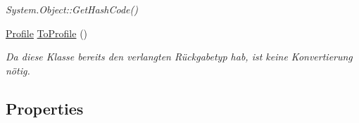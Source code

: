 \begin{CompactItemize}
\begin{CompactList}\small\item\em System.Object::Get\-Hash\-Code() \item\end{CompactList}\item 
\hyperlink{classmy_m_d_1_1_model_1_1_data_model_1_1_profile}{Profile} \hyperlink{classmy_m_d_1_1_model_1_1_data_model_1_1_profile_9e2661eb12db275911475edec4a72773}{To\-Profile} ()
\begin{CompactList}\small\item\em Da diese Klasse bereits den verlangten R\"{u}ckgabetyp hab, ist keine Konvertierung n\"{o}tig. \item\end{CompactList}\end{CompactItemize}
\subsection*{Properties}
